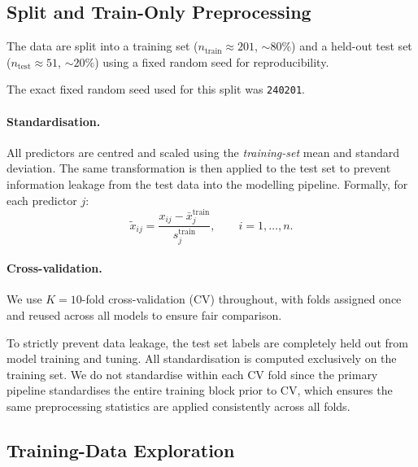 \begin{table}[H]
\centering
\caption{Descriptive statistics of retained predictors (training set).}
\label{tab:summary-stats}

\end{table}

\subsection{Split and Train-Only Preprocessing}
\label{sec:split-preprocess}

The data are split into a training set ($n_{\mathrm{train}} \approx 201$,
$\sim 80\%$) and a held-out test set ($n_{\mathrm{test}} \approx 51$,
$\sim 20\%$) using a fixed random seed for reproducibility.

The exact fixed random seed used for this split was \texttt{240201}.

\paragraph{Standardisation.}
All predictors are centred and scaled using the \emph{training-set} mean and
standard deviation.  The same transformation is then applied to the test set to
prevent information leakage from the test data into the modelling pipeline.
Formally, for each predictor $j$:
\[
    \tilde{x}_{ij}
    = \frac{x_{ij} - \bar{x}_j^{\mathrm{train}}}
           {s_j^{\mathrm{train}}},
    \qquad i = 1, \dots, n.
\]

\paragraph{Cross-validation.}
We use $K = 10$-fold cross-validation (CV) throughout, with folds assigned once
and reused across all models to ensure fair comparison.

To strictly prevent data leakage, the test set labels are completely held out from model training and tuning. All standardisation is computed exclusively on the training set. We do not standardise within each CV fold since the primary pipeline standardises the entire training block prior to CV, which ensures the same preprocessing statistics are applied consistently across all folds.

\subsection{Training-Data Exploration}
\label{sec:eda}

